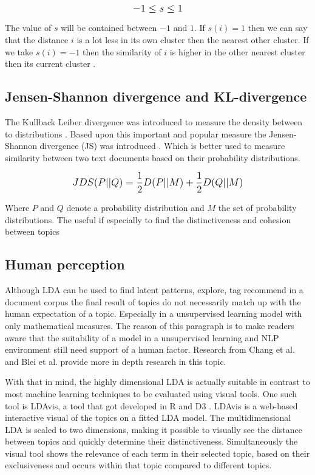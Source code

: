 \[
\mathlarger{-1 \leq s \le 1}
\]

The value of $s$ will be contained between $-1$ and $1$. If $s(i) = 1$ then we can say that the distance $i$  is a lot less in its own cluster then the nearest other cluster. If we take $s(i) = -1$ then the similarity of $i$ is higher in the other nearest cluster then its current cluster \cite{Rousseeuw1987Silhouettes:Analysis}.


\subsection{Jensen-Shannon divergence and KL-divergence} \label{research:jsdivergence}
The Kullback Leiber divergence was introduced to measure the density between to distributions \cite{Hershey2007ApproximatingModels}. Based upon this important and popular measure the Jensen-Shannon divergence (JS) was introduced \cite{Fuglede2004Jensen-ShannonEmbedding}. Which is better used to measure similarity between two text documents based on their probability distributions.

\[
\mathlarger{JDS(P||Q) = \frac{1}{2}D(P||M) + \frac{1}{2}D(Q||M)}
\]

Where $P$ and $Q$ denote a probability distribution and $M$ the set of probability distributions. The useful if especially to find the distinctiveness and cohesion between topics

\subsection{Human perception}\label{methodology:humanperception}
Although LDA can be used to find latent patterns, explore, tag recommend in a document corpus the final result of topics do not necessarily match up with the human expectation of a topic. Especially in a unsupervised learning model with only mathematical measures\cite{Towne2016MeasuringPerception}. The reason of this paragraph is to make readers aware that the suitability of a model in a unsupervised learning and NLP environment still need support of a human factor. Research from Chang  et al. \cite{Chang2009ReadingModels} and Blei et al. \cite{Chaney2012VisualizingModels.} provide more in depth research in this topic.  

With that in mind, the highly dimensional LDA is actually suitable in contrast to most machine learning techniques to be evaluated using visual tools. One such tool is LDAvis, a tool that got developed in R and D3 \cite{Sievert2014}. LDAvis is a web-based interactive visual of the topics on a fitted LDA model. The multidimensional LDA is scaled to two dimensions, making it possible to visually see the distance between topics and quickly determine their distinctiveness. Simultaneously the visual tool shows the relevance of each term in their selected topic, based on their exclusiveness and occurs within that topic compared to different topics.

